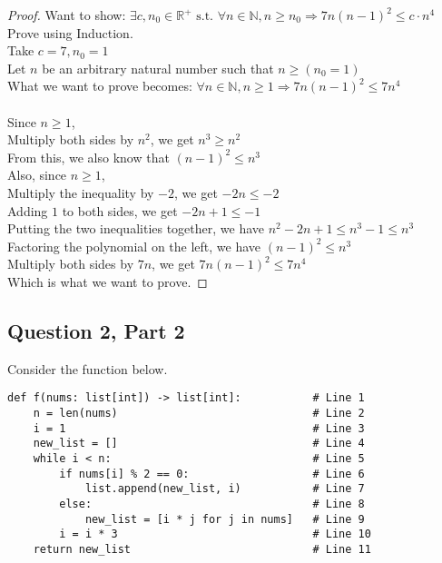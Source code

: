 \documentclass{article}
\newcommand{\N}{\mathbb{N}}
\newcommand{\R}{\mathbb{R}}
\begin{document}
\begin{enumerate}
\begin{proof}
Want to show: $\exists c, n_0 \in \R^+ \text{ s.t. } \forall n \in \N, n \ge n_0 \Rightarrow 7n(n-1)^2 \le c \cdot n^4$ \\
Prove using Induction. \\
Take $c = 7, n_0 = 1$ \\
Let $n$ be an arbitrary natural number such that $n \ge (n_0 = 1)$ \\
What we want to prove becomes: $\forall n \in \N, n \ge 1 \Rightarrow 7n(n-1)^2 \le 7n^4$ \\
\\
Since $n \ge 1$, \\
Multiply both sides by $n^2$, we get $n^3 \ge n^2$ \\
From this, we also know that $(n - 1)^2 \le n^3$ \\
Also, since $n \ge 1$, \\
Multiply the inequality by $-2$, we get $-2n \le -2$ \\
Adding $1$ to both sides, we get $-2n + 1 \le -1$ \\
Putting the two inequalities together, we have $n^2 - 2n + 1 \le n^3 - 1 \le n^3$ \\ 
Factoring the polynomial on the left, we have $(n - 1)^2 \le n^3$ \\
Multiply both sides by $7n$, we get $7n(n - 1)^2 \le 7n^4$\\
Which is what we want to prove.

\end{proof}

\end{enumerate}

\subsection*{Question 2, Part 2}

\noindent
Consider the function below.

\begin{verbatim}
def f(nums: list[int]) -> list[int]:           # Line 1
    n = len(nums)                              # Line 2
    i = 1                                      # Line 3
    new_list = []                              # Line 4
    while i < n:                               # Line 5
        if nums[i] % 2 == 0:                   # Line 6
            list.append(new_list, i)           # Line 7
        else:                                  # Line 8
            new_list = [i * j for j in nums]   # Line 9
        i = i * 3                              # Line 10
    return new_list                            # Line 11
\end{verbatim}
\end{document}
